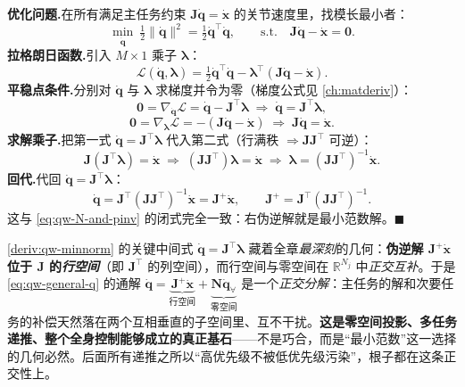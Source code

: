 \begin{derivation}[伪逆 $=$ 最小范数解]\label{deriv:qw-minnorm}
\textbf{优化问题.}\;在所有满足主任务约束 $\boldsymbol{J}\dot{\boldsymbol{q}}=\dot{\boldsymbol{x}}$ 的关节速度里，找模长最小者：
\[
  \min_{\dot{\boldsymbol{q}}}\ \tfrac12\|\dot{\boldsymbol{q}}\|^2=\tfrac12\dot{\boldsymbol{q}}^\top\dot{\boldsymbol{q}},
  \qquad\text{s.t.}\quad \boldsymbol{J}\dot{\boldsymbol{q}}-\dot{\boldsymbol{x}}=\mathbf{0}.
\]
\textbf{拉格朗日函数.}\;引入 $M\times1$ 乘子 $\boldsymbol{\lambda}$：
\[
  \mathcal{L}(\dot{\boldsymbol{q}},\boldsymbol{\lambda})=\tfrac12\dot{\boldsymbol{q}}^\top\dot{\boldsymbol{q}}-\boldsymbol{\lambda}^\top(\boldsymbol{J}\dot{\boldsymbol{q}}-\dot{\boldsymbol{x}}).
\]
\textbf{平稳点条件.}\;分别对 $\dot{\boldsymbol{q}}$ 与 $\boldsymbol{\lambda}$ 求梯度并令为零（梯度公式见 \cref{ch:matderiv}）：
\[
  \mathbf{0}=\nabla_{\dot{\boldsymbol{q}}}\mathcal{L}=\dot{\boldsymbol{q}}-\boldsymbol{J}^\top\boldsymbol{\lambda}
  \;\Longrightarrow\;\dot{\boldsymbol{q}}=\boldsymbol{J}^\top\boldsymbol{\lambda},
\]
\[
  \mathbf{0}=\nabla_{\boldsymbol{\lambda}}\mathcal{L}=-(\boldsymbol{J}\dot{\boldsymbol{q}}-\dot{\boldsymbol{x}})
  \;\Longrightarrow\;\boldsymbol{J}\dot{\boldsymbol{q}}=\dot{\boldsymbol{x}}.
\]
\textbf{求解乘子.}\;把第一式 $\dot{\boldsymbol{q}}=\boldsymbol{J}^\top\boldsymbol{\lambda}$ 代入第二式（行满秩 $\Rightarrow\boldsymbol{J}\boldsymbol{J}^\top$ 可逆）：
\[
  \boldsymbol{J}(\boldsymbol{J}^\top\boldsymbol{\lambda})=\dot{\boldsymbol{x}}
  \;\Longrightarrow\;(\boldsymbol{J}\boldsymbol{J}^\top)\boldsymbol{\lambda}=\dot{\boldsymbol{x}}
  \;\Longrightarrow\;\boldsymbol{\lambda}=(\boldsymbol{J}\boldsymbol{J}^\top)^{-1}\dot{\boldsymbol{x}}.
\]
\textbf{回代.}\;代回 $\dot{\boldsymbol{q}}=\boldsymbol{J}^\top\boldsymbol{\lambda}$：
\[
  \dot{\boldsymbol{q}}=\boldsymbol{J}^\top(\boldsymbol{J}\boldsymbol{J}^\top)^{-1}\dot{\boldsymbol{x}}=\boldsymbol{J}^+\dot{\boldsymbol{x}},
  \qquad \boldsymbol{J}^+=\boldsymbol{J}^\top(\boldsymbol{J}\boldsymbol{J}^\top)^{-1}.
\]
这与 \cref{eq:qw-N-and-pinv} 的闭式完全一致：右伪逆解就是最小范数解。$\blacksquare$
\end{derivation}

\begin{insight}\label{ins:qw-rowspace}
\cref{deriv:qw-minnorm} 的关键中间式 $\dot{\boldsymbol{q}}=\boldsymbol{J}^\top\boldsymbol{\lambda}$ 藏着全章\emph{最深刻}的几何：\textbf{伪逆解 $\boldsymbol{J}^+\dot{\boldsymbol{x}}$ 位于 $\boldsymbol{J}$ 的\emph{行空间}}（即 $\boldsymbol{J}^\top$ 的列空间），而行空间与零空间在 $\mathbb{R}^{N_j}$ 中\emph{正交互补}。于是 \cref{eq:qw-general-q} 的通解 $\dot{\boldsymbol{q}}=\underbrace{\boldsymbol{J}^+\dot{\boldsymbol{x}}}_{\text{行空间}}+\underbrace{\boldsymbol{N}\dot{\boldsymbol{q}}_{\forall}}_{\text{零空间}}$ 是一个\emph{正交分解}：主任务的解和次要任务的补偿天然落在两个互相垂直的子空间里、互不干扰。\textbf{这是零空间投影、多任务递推、整个全身控制能够成立的真正基石}——不是巧合，而是“最小范数”这一选择的几何必然。后面所有递推之所以“高优先级不被低优先级污染”，根子都在这条正交性上。
\end{insight}

